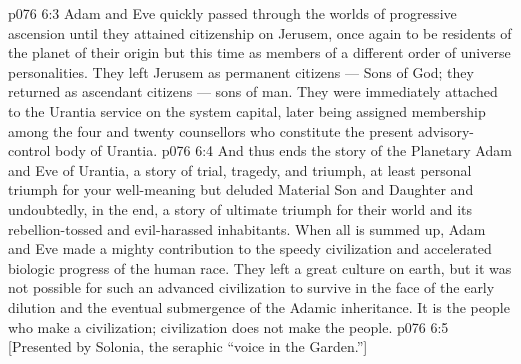 \vs p076 6:3 \pc Adam and Eve quickly passed through the worlds of progressive ascension until they attained citizenship on Jerusem, once again to be residents of the planet of their origin but this time as members of a different order of universe personalities. They left Jerusem as permanent citizens --- Sons of God; they returned as ascendant citizens --- sons of man. They were immediately attached to the Urantia service on the system capital, later being assigned membership among the four and twenty counsellors who constitute the present advisory\hyp{}control body of Urantia.
\vs p076 6:4 \pc And thus ends the story of the Planetary Adam and Eve of Urantia, a story of trial, tragedy, and triumph, at least personal triumph for your well\hyp{}meaning but deluded Material Son and Daughter and undoubtedly, in the end, a story of ultimate triumph for their world and its rebellion\hyp{}tossed and evil\hyp{}harassed inhabitants. When all is summed up, Adam and Eve made a mighty contribution to the speedy civilization and accelerated biologic progress of the human race. They left a great culture on earth, but it was not possible for such an advanced civilization to survive in the face of the early dilution and the eventual submergence of the Adamic inheritance. It is the people who make a civilization; civilization does not make the people.
\vsetoff
\vs p076 6:5 [Presented by Solonia, the seraphic “voice in the Garden.”]
\quizlink
